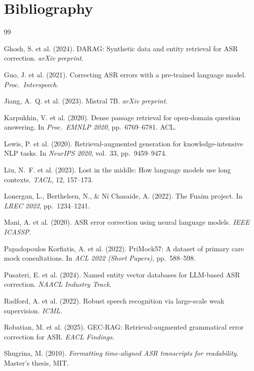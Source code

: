 \documentclass[11pt,a4paper,twocolumn]{article}
\begin{document}
\section*{Bibliography}
\begin{thebibliography}{99}

Ghosh, S. et al. (2024). DARAG: Synthetic data and entity retrieval for ASR
correction. \textit{arXiv preprint}.

Guo, J. et al. (2021). Correcting ASR errors with a pre-trained language model.
\textit{Proc.\ Interspeech}.

Jiang, A.~Q. et al. (2023). Mistral 7B. \textit{arXiv preprint}.

Karpukhin, V. et al. (2020). Dense passage retrieval for open-domain question
answering. In \textit{Proc.\ EMNLP 2020}, pp.\ 6769--6781. ACL.

Lewis, P. et al. (2020). Retrieval-augmented generation for knowledge-intensive NLP
tasks. In \textit{NeurIPS 2020}, vol.\ 33, pp.\ 9459--9474.

Liu, N.~F. et al. (2023). Lost in the middle: How language models use long contexts.
\textit{TACL}, 12, 157--173.

Lonergan, L., Berthelsen, N., \& N\'{i} Chasaide, A. (2022). The Fuaim project.
In \textit{LREC 2022}, pp.\ 1234--1241.

Mani, A. et al. (2020). ASR error correction using neural language models.
\textit{IEEE ICASSP}.

Papadopoulos Korfiatis, A. et al. (2022). PriMock57: A dataset of primary care
mock consultations. In \textit{ACL 2022 (Short Papers)}, pp.\ 588--598.

Pusateri, E. et al. (2024). Named entity vector databases for LLM-based ASR
correction. \textit{NAACL Industry Track}.

Radford, A. et al. (2022). Robust speech recognition via large-scale weak
supervision. \textit{ICML}.

Robatian, M. et al. (2025). GEC-RAG: Retrieval-augmented grammatical error
correction for ASR. \textit{EACL Findings}.

Shugrina, M. (2010). \textit{Formatting time-aligned ASR transcripts for
readability}. Master's thesis, MIT.


\end{thebibliography}
\end{document}
